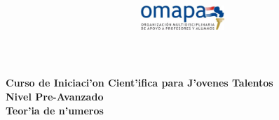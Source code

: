 \documentclass{article}
\title{
\begin{center}
\includegraphics[width=120px, height=40px]{omapa.jpg}\\
\end{center}
}
\date{}
\begin{document}
\maketitle
\begin{center}
\bfseries{Curso de Iniciaci'on Cient'ifica para J'ovenes Talentos\\
Nivel Pre-Avanzado \\
Teor'ia de n'umeros}
\end{center}




\end{document}
